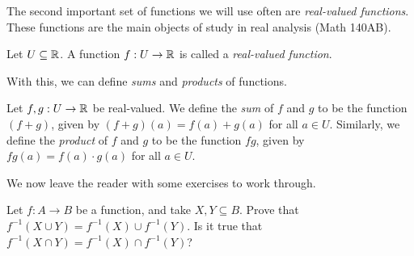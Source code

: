\documentclass{article}
\begin{document}
The second important set of functions we will use often are \textit{real-valued functions}. These functions are the main objects of study in real analysis (Math 140AB).
\begin{definition}
Let $U\subseteq \mathbb R$. A function $f: U\to \mathbb R$ is called a \textit{real-valued function}.
\end{definition}
With this, we can define \textit{sums} and \textit{products} of functions.
\begin{definition}
Let $f, g: U\to\mathbb R$ be real-valued. We define the \textit{sum} of $f$ and $g$ to be the function $(f+g)$, given by $(f+g)(a) = f(a) + g(a)$ for all $a\in U$. Similarly, we define the \textit{product} of $f$ and $g$ to be the function $fg$, given by $fg(a) = f(a) \cdot g(a)$ for all $a\in U$.
\end{definition}

We now leave the reader with some exercises to work through.
\begin{exercise}
Let $f: A\to B$ be a function, and take $X,Y\subseteq B$. Prove that $f^{-1}(X\cup Y) = f^{-1}(X) \cup f^{-1}(Y)$. Is it true that $f^{-1}(X\cap Y) = f^{-1}(X)\cap f^{-1}(Y)$?
\end{exercise}
 
\end{document}
